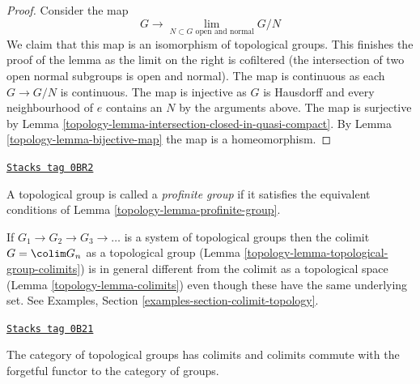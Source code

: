 \begin{proof}
\medskip\noindent
Consider the map
$$
G \longrightarrow \lim_{N \subset G\text{ open and normal}} G/N
$$
We claim that this map is an isomorphism of topological groups.
This finishes the proof of the lemma as the limit on the right
is cofiltered (the intersection of two open normal subgroups is
open and normal). The map is continuous as each $G \to G/N$ is continuous.
The map is injective as $G$ is Hausdorff and every neighbourhood
of $e$ contains an $N$ by the arguments above.
The map is surjective by
Lemma \ref{topology-lemma-intersection-closed-in-quasi-compact}.
By Lemma \ref{topology-lemma-bijective-map} the map is a homeomorphism.
\end{proof}

\begin{definition}
\label{topology-definition-profinite-group}
\href{https://stacks.math.columbia.edu/tag/0BR2}{\texttt{Stacks tag 0BR2}}

A topological group is called a {\it profinite group} if it satisfies
the equivalent conditions of Lemma \ref{topology-lemma-profinite-group}.
\end{definition}

If $G_1 \to G_2 \to G_3 \to \ldots$ is a system of topological groups
then the colimit $G = \colim G_n$ as a topological group
(Lemma \ref{topology-lemma-topological-group-colimits}) is in general different
from the colimit as a topological space (Lemma \ref{topology-lemma-colimits})
even though these have the same underlying set. See
Examples, Section \ref{examples-section-colimit-topology}.

\begin{lemma}
\label{topology-lemma-topological-group-colimits}
\href{https://stacks.math.columbia.edu/tag/0B21}{\texttt{Stacks tag 0B21}}

The category of topological groups has colimits and colimits commute
with the forgetful functor to the category of groups.
\end{lemma}

